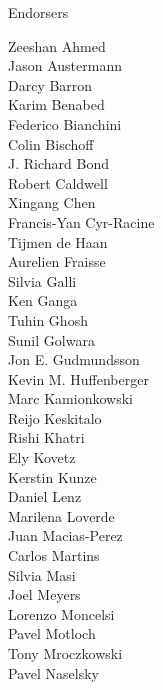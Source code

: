 \documentclass[PICOReport.tex]{subfiles}
\begin{document}
{\Large { \centerline {Endorsers}}

\footnotesize {

\begin{multicols}{4}
Zeeshan Ahmed                   \\
Jason Austermann                \\
Darcy Barron                    \\
Karim Benabed                   \\
Federico Bianchini              \\
Colin Bischoff                  \\
J. Richard Bond                 \\
Robert Caldwell                 \\
Xingang Chen                    \\
Francis-Yan Cyr-Racine          \\
Tijmen de Haan                  \\
Aurelien Fraisse                \\
Silvia Galli                    \\
Ken Ganga                       \\
Tuhin Ghosh                     \\
Sunil Golwara                   \\
Jon E. Gudmundsson              \\
Kevin M. Huffenberger           \\
Marc Kamionkowski               \\
Reijo Keskitalo                 \\
Rishi Khatri                    \\
Ely Kovetz                      \\
Kerstin Kunze                   \\
Daniel Lenz                     \\
Marilena Loverde                \\
Juan Macias-Perez               \\
Carlos Martins                  \\
Silvia Masi                     \\
Joel Meyers                     \\
Lorenzo Moncelsi                \\
Pavel Motloch                   \\
Tony Mroczkowski                \\
Pavel Naselsky                  \\

\end{multicols}}}
\end{document}

